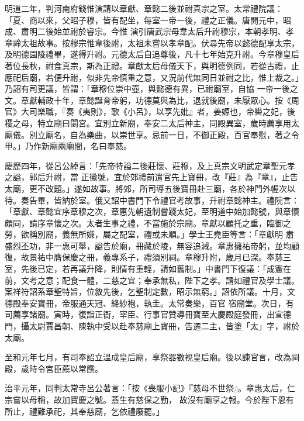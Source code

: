 \begin{pinyinscope}
 明道二年，判河南府錢惟演請以章獻、章懿二後並祔真宗之室。太常禮院議：「夏、商以來，父昭子穆，皆有配坐，每室一帝一後，禮之正儀。唐開元中，昭成、肅明二後始並祔於睿宗。今惟
 演引唐武宗母韋太后升祔穆宗，本朝孝明、孝章禘太祖故事。按穆宗惟韋後祔，太祖未嘗以孝章配。伏尋先帝以懿德配享太宗，及明德園陵禮畢，遂得升祔。元德太后自追尊後，凡十七年始克升祔。今章穆皇后著位長秋，祔食真宗，斯為正禮。章獻太后母儀天下，與明德例同，若從古禮，止應祀后廟，若便升祔，似非先帝慎重之意，又況前代無同日並祔之比，惟上裁之。」乃詔有司更議，皆謂：「章穆位崇中壺，與懿德有異，已祔廟室，自協
 一帝一後之文。章獻輔政十年，章懿誕育帝躬，功德莫與為比，退就後廟，未厭眾心。按《周官》大司樂職，『奏《夷則》，歌《小呂》，以享先妣』者，姜嫄也，帝嚳之妃，後稷之母，特立廟曰閟宮。宜別立新廟，奉安二太后神主，同殿異室，歲時薦享用太廟儀。別立廟名，自為樂曲，以崇世享。忌前一日，不御正殿，百官奉慰，著之令甲。」乃作新廟兩廟間，名曰奉慈。



 慶歷四年，從呂公綽言：「先帝特謚二後莊懷、莊穆，及上真宗文明武定章聖元孝之謚，郭后升祔，當
 正徽號，宜於郊禮前遣官先上寶冊，改『莊』為『章』，止告太廟，更不改題。」遂如故事。將郊，所司導五後寶冊赴三廟，各於神門外幄次以待。奏告畢，皆納於室。俄又詔中書門下令禮官考故事，升祔章懿神主。禮院言：「章獻、章懿宜序章穆之次，章惠先朝遺制嘗踐太妃，至明道中始加懿號，與章懷頗同，請序章懷之次。太者生事之禮，不當施於宗廟。章獻以顧托之重，臨御之勞，欲稱別廟，義無所嫌，屬之配室，禮或未順。」學士王堯臣等言：「章獻明
 肅盛烈丕功，非一惠可舉，謚告於廟，冊藏於陵，無容追減。章惠擁祐帝躬，並均顧復，故景祐中膺保慶之冊，義專系子，禮須別祠。章穆升附，歲月已深。奉慈三室，先後已定，若再議升降，則情有重輕，請如舊制。」中書門下復議：「成憲在前，文考之意；配食一體，二慈之宜；奉承無私，陛下之孝。請如禮官及學士議。案祥符詔系章聖特旨，位敘先後，乞聖制定數，昭示無窮。」詔依所議。十月，文德殿奉安寶冊，帝服通天冠、絳紗袍，執圭。太常奏樂，百官
 宿廟堂。次日，有司薦享諸廟。寅時，復詣正衙，宰臣、行事官贊導冊寶至大慶殿庭發冊，出宣德門，攝太尉賈昌朝、陳執中受以赴奉慈廟上寶冊，告遷二主，皆塗「太」字，祔於太廟。



 至和元年七月，有司奉詔立溫成皇后廟，享祭器數視皇后廟。後以諫官言，改為祠殿，歲時令宮臣薦以常饌。



 治平元年，同判太常寺呂公著言：「按《喪服小記》『慈母不世祭』。章惠太后，仁宗嘗以母稱，故加寶慶之號。蓋生有慈保之勤，
 故沒有廟享之報。今於陛下恩有所止，禮難承祀，其奉慈廟，乞依禮廢罷。」




\end{pinyinscope}

